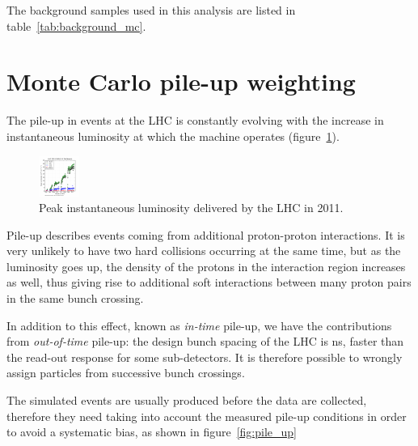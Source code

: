 The background samples used in this analysis are listed in
table~\ref{tab:background_mc}.



\section{Monte Carlo pile-up weighting}
The pile-up in events at the LHC is constantly evolving with the increase in
instantaneous luminosity at which the machine operates
(figure~\ref{fig:inst_lumi}).
\begin{figure}[htb]
    \centering
    \includegraphics[width=.7\textwidth]{images/pdf/plu_days_liny}

    \caption{Peak instantaneous luminosity delivered by the LHC in 2011.}
    \label{fig:inst_lumi}
\end{figure}
Pile-up describes events coming from additional proton-proton interactions.
It is very unlikely to have two hard collisions occurring at the same time,
but as the luminosity goes up, the density of the protons in the interaction
region increases as well, thus giving rise to additional soft interactions
between many proton pairs in the same bunch crossing.

In addition to this effect, known as \emph{in-time} pile-up, we have the
contributions from \emph{out-of-time} pile-up: the design bunch spacing
of the LHC is \unit[25]{ns}, faster than the read-out response for some
sub-detectors. It is therefore possible to wrongly assign particles
from successive bunch crossings.

The simulated events
are usually produced before the data are collected, therefore they need
taking into account the measured pile-up conditions in order to
avoid a systematic bias, as shown in figure~\ref{fig:pile_up}

